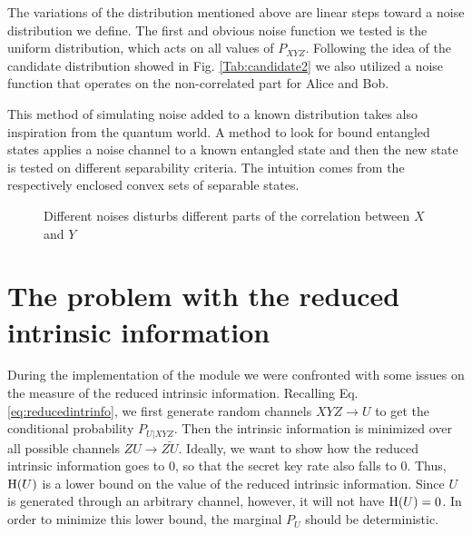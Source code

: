 	The variations of the distribution mentioned above are linear steps toward a noise distribution we define.
	The first and obvious noise function we tested is the uniform distribution, which acts on all values of $P_{XYZ}$.
	Following the idea of the candidate distribution showed in Fig. \ref{Tab:candidate2} we  also utilized a noise function that operates on the non-correlated part for Alice and Bob.
	
	This method of simulating noise added to a known distribution takes also inspiration from the quantum world. 
	A method to look for bound entangled states applies a noise channel to a known entangled state and then the new state is tested on different separability criteria.
	The intuition comes from the respectively enclosed convex sets of separable states.
	
	 
	\begin{figure}
		\begin{subfigure}{0.5\textwidth}
			
			\label{Fig:noise1}
		\end{subfigure}
		\begin{subfigure}{0.5\textwidth}
			
			\label{Fig:noise2}
		\end{subfigure}
		\caption{Different noises disturbs different parts of the correlation between $X$ and $Y$}
		\label{Fig:noises}
	\end{figure}
	
\section{The problem with the reduced intrinsic information}
    During the implementation of the module we were confronted with some issues on the measure of the reduced intrinsic information.
    Recalling Eq. \ref{eq:reducedintrinfo}, we first generate random channels $XYZ \rightarrow U$ to get the conditional probability $P_{U|XYZ}$. 
    Then the intrinsic information is minimized over all possible channels $ZU \rightarrow \bar{ZU}$.
    Ideally, we want to show how the reduced intrinsic information goes to $0$, so that the secret key rate also falls to $0$. 
    Thus, $\operatorname{H} (U)$ is a lower bound on the value of the reduced intrinsic information.
    Since $U$ is generated through an arbitrary channel, however, it will not have $\operatorname{H} (U) = 0$.
    In order to minimize this lower bound, the marginal $P_U$ should be deterministic.
    

